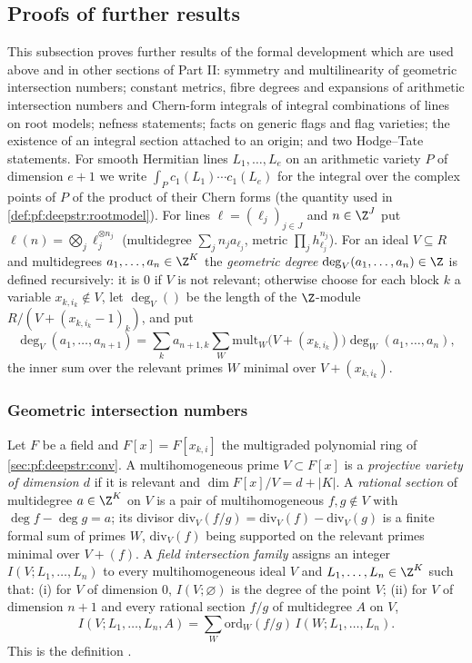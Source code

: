 \subsection{Proofs of further results}\label{sec:pf:deepstr:further}

This subsection proves further results of the formal development which are used above and in other
sections of Part II: symmetry and multilinearity of geometric intersection numbers; constant metrics, fibre
degrees and expansions of arithmetic intersection numbers and Chern-form integrals of integral combinations of
lines on root models; nefness statements; facts on generic flags and flag varieties; the existence of an
integral section attached to an origin; and two Hodge--Tate statements. For smooth Hermitian lines $L_1,\dots,L_e$ on an arithmetic variety $P$ of dimension $e+1$ we
write $\int_Pc_1(L_1)\cdots c_1(L_e)$ for the integral over the complex points of $P$ of the product of their
Chern forms (the quantity used in \cref{def:pf:deepstr:rootmodel}). For lines $\ell=(\ell_j)_{j\in J}$ and
$n\in\Z^J$ put $\ell(n)=\bigotimes_j\ell_j^{\otimes n_j}$ (multidegree $\sum_jn_ja_{\ell_j}$, metric $\prod_jh_{\ell_j}^{n_j}$).
For an ideal $V\subseteq R$ and multidegrees $a_1,\dots,a_n\in\Z^K$ the \emph{geometric degree}
$\deg_V(a_1,\dots,a_n)\in\Z$ is defined recursively: it is $0$ if $V$ is not relevant; otherwise choose for each
block $k$ a variable $x_{k,i_k}\notin V$, let $\deg_V()$ be the length of the $\Z$-module $R/(V+(x_{k,i_k}-1)_k)$, and put
\[
\deg_V(a_1,\dots,a_{n+1})=\sum_ka_{n+1,k}\sum_W\mathrm{mult}_W\bigl(V+(x_{k,i_k})\bigr)\deg_W(a_1,\dots,a_n),
\]
the inner sum over the relevant primes $W$ minimal over $V+(x_{k,i_k})$.

\subsubsection*{Geometric intersection numbers}

\begin{definition}\label{def:pf:deepstr:fieldint}
Let $F$ be a field and $F[x]=F[x_{k,i}]$ the multigraded polynomial ring of \cref{sec:pf:deepstr:conv}. A
multihomogeneous prime $V\subset F[x]$ is a \emph{projective variety of dimension $d$} if it is relevant and
$\dim F[x]/V=d+|K|$. A \emph{rational section} of multidegree $a\in\Z^K$ on $V$ is a pair of multihomogeneous
$f,g\notin V$ with $\deg f-\deg g=a$; its divisor $\mathrm{div}_V(f/g)=\mathrm{div}_V(f)-\mathrm{div}_V(g)$ is a finite
formal sum of primes $W$, $\mathrm{div}_V(f)$ being supported on the relevant primes minimal over $V+(f)$. A
\emph{field intersection family} assigns an integer $I(V;L_1,\dots,L_n)$ to every
multihomogeneous ideal $V$ and $L_1,\dots,L_n\in\Z^K$ such that: (i) for $V$ of dimension $0$, $I(V;\varnothing)$
is the degree of the point $V$; (ii) for $V$ of dimension $n+1$ and every rational section $f/g$ of
multidegree $A$ on $V$,
\[
I(V;L_1,\dots,L_n,A)=\sum_W\mathrm{ord}_W(f/g)\,I(W;L_1,\dots,L_n).
\]
This is the definition .
\end{definition}

